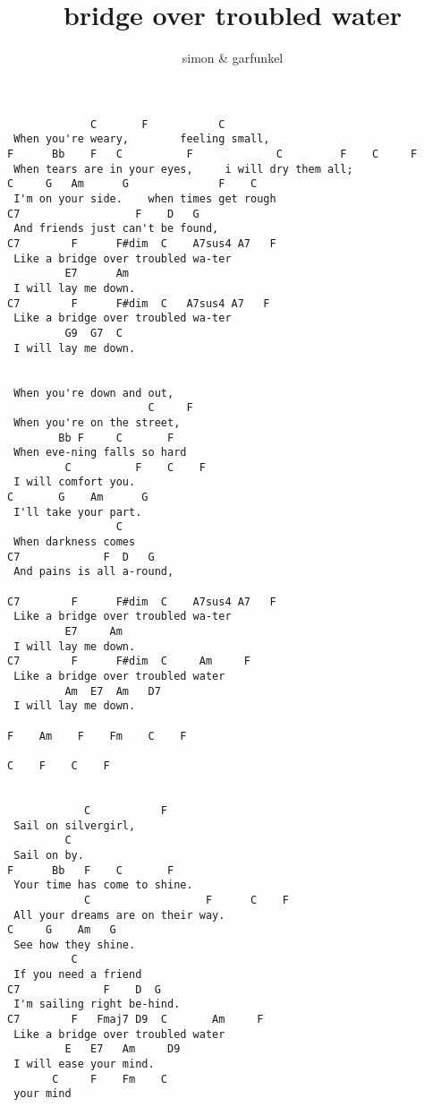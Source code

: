 \author{simon \& garfunkel}
\title{bridge over troubled water}
\maketitle
\begin{verbatim}
             C       F           C
 When you're weary,        feeling small,
F      Bb    F   C          F             C         F    C     F
 When tears are in your eyes,     i will dry them all;
C     G   Am      G              F    C
 I'm on your side.    when times get rough
C7                  F    D   G
 And friends just can't be found,
C7        F      F#dim  C    A7sus4 A7   F
 Like a bridge over troubled wa-ter
         E7      Am
 I will lay me down.
C7        F      F#dim  C   A7sus4 A7   F
 Like a bridge over troubled wa-ter
         G9  G7  C
 I will lay me down.


 When you're down and out,
                      C     F
 When you're on the street,
        Bb F     C       F
 When eve-ning falls so hard
         C          F    C    F
 I will comfort you.
C       G    Am      G
 I'll take your part.
                 C
 When darkness comes
C7             F  D   G
 And pains is all a-round,

C7        F      F#dim  C    A7sus4 A7   F
 Like a bridge over troubled wa-ter
         E7     Am
 I will lay me down.
C7        F      F#dim  C     Am     F
 Like a bridge over troubled water
         Am  E7  Am   D7
 I will lay me down.

F    Am    F    Fm    C    F

C    F    C    F


            C           F
 Sail on silvergirl,
         C
 Sail on by.
F      Bb   F    C       F
 Your time has come to shine.
            C                  F      C    F
 All your dreams are on their way.
C     G    Am   G
 See how they shine.
          C
 If you need a friend
C7             F    D  G
 I'm sailing right be-hind.
C7        F   Fmaj7 D9  C       Am     F
 Like a bridge over troubled water
         E   E7   Am     D9
 I will ease your mind.
       C     F    Fm    C
 your mind
\end{verbatim}